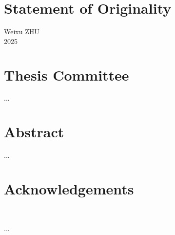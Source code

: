 \documentclass[12pt]{report}
\begin{document}
\newpage
\setcounter{page}{1}

\chapter*{Statement of Originality}

\vspace{10pt}

\begin{FlushRight}
Weixu ZHU \\
2025
\end{FlushRight}


\chapter*{Thesis Committee}
...



\chapter*{Abstract}
...



\chapter*{Acknowledgements}\

...



\tableofcontents{}

\newpage
\thispagestyle{empty}
\mbox{}
\newpage




\thispagestyle{noheaderfooter}














\end{document}
